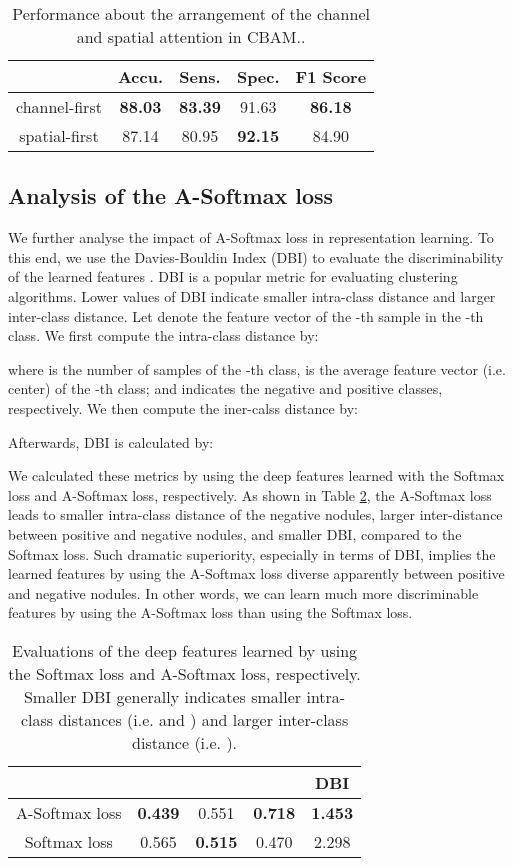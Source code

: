 \documentclass[final,5p,times,twocolumn]{elsarticle}
\begin{document}
\begin{table}
\centering
\caption{Performance about the arrangement of the channel and spatial attention in CBAM..}
\small
\label{tab:cbam}
\begin{tabular}{c|cccc}
\toprule
& Accu.	& Sens.	& Spec.	& F1 Score \\
\midrule	
channel-first & 	\textbf{88.03}	& \textbf{83.39}	& 91.63	& \textbf{86.18} \\
spatial-first & 	87.14	& 80.95	& \textbf{92.15}	& 84.90 \\
\bottomrule												
\end{tabular}
\end{table}


\subsection{Analysis of the A-Softmax loss}
\label{ssec:exp_sphere}

We further analyse the impact of A-Softmax loss in representation learning.
 To this end, we use the Davies-Bouldin Index (DBI) to evaluate the discriminability of the learned features \cite{davies1979cluster}. DBI is a popular metric for evaluating clustering algorithms. Lower values of DBI indicate smaller intra-class distance and larger inter-class distance. Let  denote the feature vector of the -th sample in the -th class. We first compute the intra-class distance by:
 
where  is the number of samples of the -th class,  is the average feature vector (i.e. center) of the -th class;  and  indicates the negative and positive classes, respectively. We then compute the iner-calss distance by: 
 
Afterwards, DBI is calculated by: 
 

We calculated these metrics by using the deep features learned with the Softmax loss and A-Softmax loss, respectively. As shown in Table \ref{tab:asoft}, the A-Softmax loss leads to smaller intra-class distance of the negative nodules, larger inter-distance between positive and negative nodules, and smaller DBI, compared to the Softmax loss. Such  dramatic superiority, especially in terms of DBI, implies the learned features by using the A-Softmax loss diverse apparently between positive and negative nodules. In other words, we can learn much more discriminable features by using the A-Softmax loss than using the Softmax loss. 
 

\begin{table}
\centering
\caption{Evaluations of the deep features learned by using the Softmax loss and A-Softmax loss, respectively. Smaller DBI generally indicates smaller intra-class distances (i.e.  and ) and larger inter-class distance (i.e. ).}
\small
\label{tab:asoft}
\begin{tabular}{c|cccc}
\toprule
&  &		& 	& DBI \\
\midrule
A-Softmax loss 	& \textbf{0.439}	& 0.551	& \textbf{0.718}	& \textbf{1.453} \\
Softmax loss	& 0.565	& \textbf{0.515}	& 0.470	& 2.298 \\
\bottomrule												
\end{tabular}
\end{table}
\end{document}
